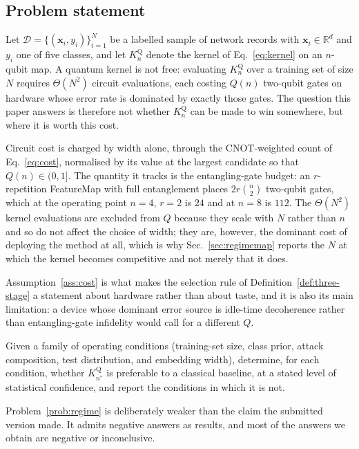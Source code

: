 \subsection{Problem statement}
\begin{revbody}

Let $\mathcal{D}=\{(\bm{x}_i,y_i)\}_{i=1}^{N}$ be a labelled sample of network
records with $\bm{x}_i\in\mathbb{R}^{d}$ and $y_i$ one of five classes, and let
$K^{\mathrm{Q}}_{n}$ denote the kernel of Eq.~\eqref{eq:kernel} on an $n$-qubit
map. A quantum kernel is not free: evaluating $K^{\mathrm{Q}}_{n}$ over a
training set of size $N$ requires $\Theta(N^2)$ circuit evaluations, each
costing $Q(n)$ two-qubit gates on hardware whose error rate is dominated by
exactly those gates. The question this paper answers is therefore not whether
$K^{\mathrm{Q}}_{n}$ can be made to win somewhere, but where it is worth this
cost.

\begin{assumption}
\label{ass:cost}
Circuit cost is charged by width alone, through the CNOT-weighted count of
Eq.~\eqref{eq:cost}, normalised by its value at the largest candidate so
that $Q(n)\in(0,1]$. The quantity it tracks is the
entangling-gate budget: an $r$-repetition \ZZ{}FeatureMap with full entanglement
places $2r\binom{n}{2}$ two-qubit gates, which at the operating point $n=4$,
$r=2$ is $24$ and at $n=8$ is $112$. The $\Theta(N^{2})$ kernel evaluations are
excluded from $Q$ because they scale with $N$ rather than $n$ and so do not
affect the choice of width; they are, however, the dominant cost of deploying
the method at all, which is why Sec.~\ref{sec:regimemap} reports the $N$ at
which the kernel becomes competitive and not merely that it does.
\end{assumption}

Assumption~\ref{ass:cost} is what makes the selection rule of
Definition~\ref{def:three-stage} a statement about hardware rather than about
taste, and it is also its main limitation: a device whose dominant error source
is idle-time decoherence rather than entangling-gate infidelity would call for a
different $Q$.

\begin{problem}
\label{prob:regime}
Given a family of operating conditions (training-set size, class prior,
attack composition, test distribution, and embedding width), determine, for
each condition, whether $K^{\mathrm{Q}}_{n^\ast}$ is preferable to a classical
baseline, at a stated level of statistical confidence, and report the conditions
in which it is not.
\end{problem}

Problem~\ref{prob:regime} is deliberately weaker than the claim the submitted
version made. It admits negative answers as results, and most of the answers we
obtain are negative or inconclusive.
\end{revbody}

